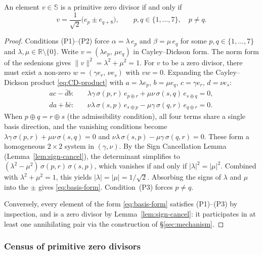 \begin{proposition}
\label{prop:basis-form}
An element $v\in\mathbb{S}$ is a primitive zero divisor if and only if
\begin{equation}\label{eq:basis-form}
  v = \frac{1}{\sqrt{2}}\bigl(e_p \pm e_{q+8}\bigr),
  \qquad p,q\in\{1,\dots,7\},\quad p\neq q.
\end{equation}
\end{proposition}

\begin{proof}
Conditions (P1)--(P2) force $\alpha = \lambda\, e_p$ and $\beta = \mu\,
e_q$ for some $p,q\in\{1,\dots,7\}$ and $\lambda,\mu\in\mathbb{R}
\setminus\{0\}$.  Write $v = (\lambda e_p,\, \mu e_q)$ in Cayley--Dickson
form.  The norm form of the sedenions gives $\|v\|^2 = \lambda^2 + \mu^2
= 1$.  For $v$ to be a zero divisor, there must exist a non-zero $w =
(\gamma e_r,\, \nu e_s)$ with $vw = 0$.  Expanding the Cayley--Dickson
product \eqref{eq:CD-product} with $a=\lambda e_p$, $b=\mu e_q$,
$c=\gamma e_r$, $d=\nu e_s$:
\begin{align*}
  ac - \bar{d}b:&\quad \lambda\gamma\,\sigma(p,r)\,e_{p\oplus r}
    + \mu\nu\,\sigma(s,q)\,e_{s\oplus q} = 0,\\
  da + b\bar{c}:&\quad \nu\lambda\,\sigma(s,p)\,e_{s\oplus p}
    - \mu\gamma\,\sigma(q,r)\,e_{q\oplus r} = 0.
\end{align*}
When $p\oplus q = r\oplus s$ (the admissibility condition), all four terms
share a single basis direction, and the vanishing conditions become
$\lambda\gamma\,\sigma(p,r) + \mu\nu\,\sigma(s,q) = 0$ and
$\nu\lambda\,\sigma(s,p) - \mu\gamma\,\sigma(q,r) = 0$.  These form a
homogeneous $2\times 2$ system in $(\gamma,\nu)$.  By the Sign
Cancellation Lemma (Lemma~\ref{lem:sign-cancel}), the determinant
simplifies to $(\lambda^2 - \mu^2)\,\sigma(p,r)\,\sigma(s,p)$, which
vanishes if and only if $|\lambda|^2 = |\mu|^2$.  Combined with $\lambda^2 + \mu^2 = 1$, this
yields $|\lambda| = |\mu| = 1/\sqrt{2}$.  Absorbing the signs of
$\lambda$ and $\mu$ into the $\pm$ gives \eqref{eq:basis-form}.
Condition~(P3) forces $p\neq q$.

Conversely, every element of the form \eqref{eq:basis-form} satisfies
(P1)--(P3) by inspection, and is a zero divisor by
Lemma~\ref{lem:sign-cancel}: it participates in at least one annihilating
pair via the construction of \S\ref{sec:mechanism}.
\end{proof}


\subsubsection*{Census of primitive zero divisors}

